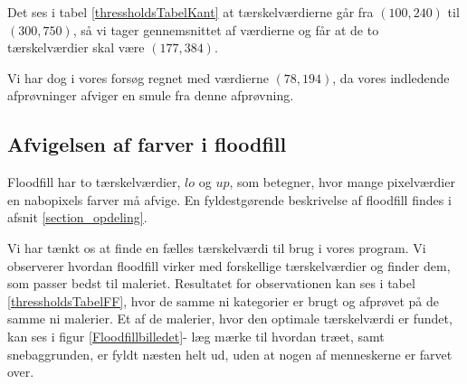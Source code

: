 Det ses i tabel \ref{thressholdsTabelKant} at tærskelværdierne går 
fra $(100,240)$ til $(300,750)$, så vi tager gennemsnittet af værdierne
og får at de to tærskelværdier skal være $(177,384)$. 

Vi har dog i vores forsøg regnet med værdierne $(78,194)$, da vores
indledende afprøvninger afviger en smule fra denne afprøvning.

\subsection{Afvigelsen af farver i floodfill}
Floodfill har to tærskelværdier, $lo$ og $up$, som betegner, hvor mange
pixelværdier en nabopixels farver må afvige. En
fyldestgørende beskrivelse af floodfill findes i afsnit
\ref{section_opdeling}. 

Vi har tænkt os at finde en fælles tærskelværdi til brug i vores
program. Vi observerer hvordan floodfill virker med forskellige
tærskelværdier og finder dem, som passer bedst til maleriet. Resultatet
for observationen kan ses i tabel \ref{thressholdsTabelFF}, hvor de
samme ni kategorier er brugt og afprøvet på de samme ni malerier. Et af
de malerier, hvor den optimale tærskelværdi er fundet, kan ses i figur
\ref{Floodfillbilledet}- læg mærke til hvordan træet, samt
snebaggrunden, er fyldt næsten helt ud, uden at nogen af menneskerne er farvet over.

